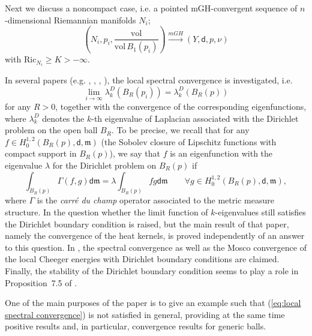 \documentclass[a4paper,11pt,reqno]{article}
\numberwithin{equation}{section}
\theoremstyle{plain}
\theoremstyle{definition}
\theoremstyle{remark}
\newcommand{\dist}{\mathsf{d}}
\newcommand{\meas}{\mathfrak{m}}
\begin{document}
Next we discuss a noncompact case, i.e. a pointed mGH-convergent sequence of $n$-dimensional Riemannian manifolds $N_i$;
\begin{equation}\label{eq:noncompact}
\left(N_i, p_i, \frac{\mathrm{vol}}{\mathrm{vol}\,B_1(p_i)}\right) \stackrel{mGH}{\to} (Y, \dist, p, \nu)
\end{equation}
with $\mathrm{Ric}_{N_i} \ge K>-\infty$.

In several papers (e.g. \cite{Ding}, \cite{KuwaeShioya03}, \cite{Xu}, \cite{ZhangZhu16}), the local spectral convergence is investigated, i.e.
\begin{equation}\label{eq:local spectral convergence}
\lim_{i \to \infty}\lambda^D_k(B_R(p_i))=\lambda_k^D(B_R(p))
\end{equation}
for any $R>0$, together with the convergence of the corresponding eigenfunctions,
where $\lambda_k^D$ denotes the $k$-th eigenvalue of Laplacian associated with the Dirichlet problem on the open ball $B_R$. 
To be precise, we recall that for any $f\in H^{1, 2}_0(B_R(p), \dist, \meas)$ (the Sobolev closure of Lipschitz
 functions with compact support in $B_R(p)$), 
we say that $f$ is an eigenfunction with the eigenvalue $\lambda$ for the Dirichlet problem on $B_R(p)$ if  
\begin{equation}\label{eq:9}
\int_{B_R(p)}\Gamma(f,g) \dist \meas = \lambda \int_{B_R(p)}fg\dist \meas
\qquad\forall g \in H^{1, 2}_0(B_R(p), \dist, \meas),
\end{equation}
where $\Gamma$ is the {\it carr\'e du champ} operator associated to the metric measure structure. In
\cite{Ding} the question whether the limit function of $k$-eigenvalues still satisfies the Dirichlet boundary condition
is raised, but the main result of that paper, namely the convergence of the heat kernels, is proved independently of
an answer to this question. In \cite{KuwaeShioya03}, the spectral convergence as well as the Mosco
convergence of the local Cheeger energies with Dirichlet boundary conditions are claimed. Finally, the stability
of the Dirichlet boundary condition seems to play a role in Proposition~7.5 of \cite{Xu}.

One of the main purposes of the paper is to give an example such that (\ref{eq:local spectral convergence}) is not satisfied
in general,
providing at the same time positive results and, in particular,  convergence results for generic balls.
\end{document}
